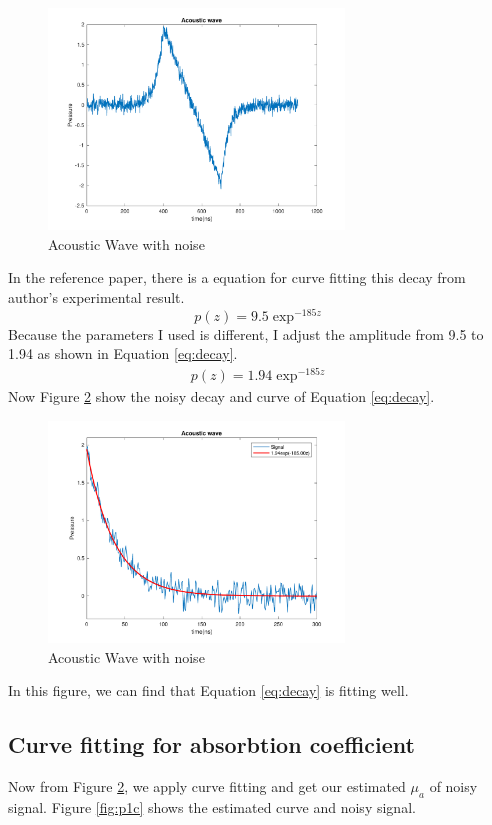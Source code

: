\documentclass{article}
\begin{document}
\begin{figure}[H]
    \centering
    \includegraphics[width=0.7\textwidth]{src/p1b-1.pdf}
    \caption{Acoustic Wave with noise}
    \label{fig:p1b-1}
\end{figure}

In the reference paper, there is a equation for curve fitting this decay from author's experimental result.
$$
    p(z) = 9.5\exp^{-185z}
$$
Because the parameters I used is different, I adjust the amplitude from 9.5 to 1.94 as shown in Equation \ref{eq:decay}.
\begin{align}
    p(z) = 1.94\exp^{-185z}
    \label{eq:decay}
\end{align}
Now Figure \ref{fig:p1b-2} show the noisy decay and curve of Equation \ref{eq:decay}.

\begin{figure}[H]
    \centering
    \includegraphics[width=0.7\textwidth]{src/p1b-2.pdf}
    \caption{Acoustic Wave with noise}
    \label{fig:p1b-2}
\end{figure}
In this figure, we can find that Equation \ref{eq:decay} is fitting well.


\subsection{Curve fitting for absorbtion coefficient}
Now from Figure \ref{fig:p1b-2}, we apply curve fitting and get our estimated $\mu_a$ of noisy signal. Figure \ref{fig:p1c} 
shows the estimated curve and noisy signal.
\end{document}
